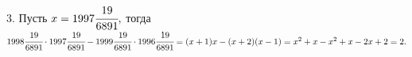 3. Пусть $x = 1997\cfrac{19}{6891},$ тогда $1998\cfrac{19}{6891}\cdot1997\cfrac{19}{6891}-1999\cfrac{19}{6891}\cdot1996\cfrac{19}{6891}=
(x+1)x-(x+2)(x-1)=x^2+x-x^2+x-2x+2=2.$\\
